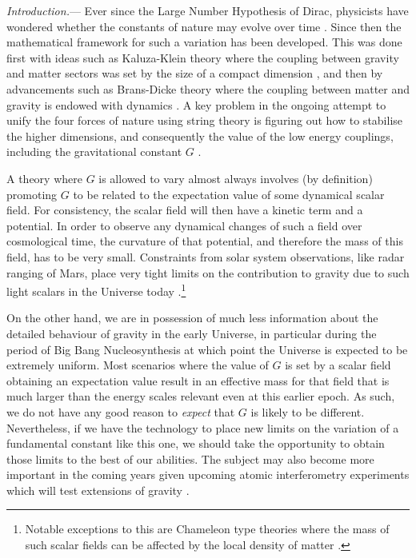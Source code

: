 \documentclass[notitlepage,twocolumn,letterpaper,natbib,aps,prl,amsmath,amsfonts,nofootinbib,preprintnumbers,superscriptaddress,secnumarabic,groupedaddress]{revtex4-1}
\begin{document}
\maketitle

\emph{Introduction.}--- \setlength\parskip{0pt}
Ever since the Large Number Hypothesis of Dirac, physicists have wondered whether the constants of nature may evolve over time \cite{1937Natur.139..323D}.  Since then the mathematical framework for such a variation has been developed. This was done first with ideas such as Kaluza-Klein theory where the coupling between gravity and matter sectors was set by the size of a compact dimension \cite{Kaluza:1984ws,Klein:1926tv}, and then by advancements such as Brans-Dicke theory where the coupling between matter and gravity is endowed with dynamics \cite{Brans:1961sx}.  A key problem in the ongoing attempt to unify the four forces of nature using string theory is figuring out how to stabilise the higher dimensions, and consequently the value of the low energy couplings, including the gravitational constant $G$ \cite{Douglas:2006es}.  

A theory where $G$ is allowed to vary almost always involves (by definition) promoting $G$ to be related to the expectation value of some dynamical scalar field. For consistency, the scalar field will then have a kinetic term and a potential.  In order to observe any dynamical changes of such a field over cosmological time, the curvature of that potential, and therefore the mass of this field, has to be very small. Constraints from solar system observations, like radar ranging of Mars, place very tight limits on the contribution to gravity due to such light scalars in the Universe today \cite{Bertotti:2003rm}.\footnote{Notable exceptions to this are Chameleon type theories where the mass of such scalar fields can be affected by the local density of matter \cite{Khoury:2003aq}.}

On the other hand, we are in possession of much less information about the detailed behaviour of gravity in the early Universe, in particular during the period of Big Bang Nucleosynthesis at which point the Universe is expected to be extremely uniform.  Most scenarios where the value of $G$ is set by a scalar field obtaining an expectation value result in an effective mass for that field that is much larger than the energy scales relevant even at this earlier epoch. As such, we do not have any good reason to {\it expect} that $G$ is likely to be different.  Nevertheless, if we have the technology to place new limits on the variation of a fundamental constant like this one, we should take the opportunity to obtain those limits to the best of our abilities.  The subject may also become more important in the coming years given upcoming atomic interferometry experiments which will test extensions of gravity \cite{Biedermann:2014jya}. 
\end{document}
